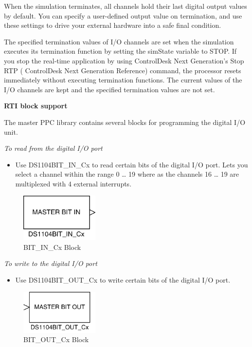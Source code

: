 When the simulation terminates, all channels hold their last digital output values by default. You can specify a user-defined output value on termination, and use these settings to drive your external hardware into a safe final condition.

The specified termination values of I/O channels are set when the simulation executes its termination function by setting the simState variable to STOP. If you stop the real‑time application by using ControlDesk Next Generation's Stop RTP ( ControlDesk Next Generation Reference) command, the processor resets immediately without executing termination functions. The current values of the I/O channels are kept and the specified termination values are not set.

\noindent \textbf{RTI block support}\par
The master PPC library contains several blocks for programming the digital I/O unit.

\textit{To read from the digital I/O port}
\begin{itemize}
    \item Use DS1104BIT\_IN\_Cx to read certain bits of the digital I/O port. Lets you select a channel within the range 0 … 19 where as the channels 16 … 19 are multiplexed with 4 external interrupts.
\end{itemize}

\begin{figure}[H]
    \centering
    \includegraphics[width=0.35\textwidth]{Images/DS1104BIT_IN_Cx.png}
    \caption{BIT\_IN\_Cx Block}
    \label{BIT_IN_Cx}
\end{figure}

\textit{To write to the digital I/O port}
\begin{itemize}
    \item Use DS1104BIT\_OUT\_Cx to write certain bits of the digital I/O port.
\end{itemize}

\begin{figure}[H]
    \centering
    \includegraphics[width=0.35\textwidth]{Images/MASTER BIT OUT.png}
    \caption{BIT\_OUT\_Cx Block}
    \label{BIT_OUT_Cx}
\end{figure}
\ \\
\ \\

